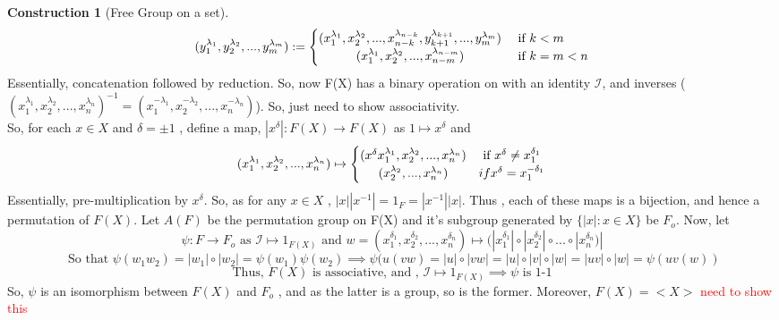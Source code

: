 \documentclass{article}
\theoremstyle{definition}
\theoremstyle{definition}
\newtheorem{construction}{Construction}[theorem]
\begin{document}
\begin{construction}[Free Group on a set]
\[			(y_1^{\lambda_1},y_2^{\lambda_2},...,y_m^{\lambda_m}):=
			\begin{cases}
				(x_1^{\lambda_1},x_2^{\lambda_2},...,x_{n-k}^{\lambda_{n-k}},
				y_{k+1}^{\lambda_{k+1}},...,y_m^{\lambda_m}) &\text{ if } k<m \\
				\hfil	(x_1^{\lambda_1},x_2^{\lambda_2},...,x_{n-m}^{\lambda_{n-m}}) & \text{ if } k=m<n \\
			\end{cases} \]
			Essentially, concatenation followed by reduction. So, now F(X) has a binary operation on with an identity $\mathcal{I}$, and inverses ($(x_1^{\lambda_1},x_2^{\lambda_2},...,x_n^{\lambda_n})^{-1}=
			(x_1^{-\lambda_1},x_2^{-\lambda_2},...,x_n^{-\lambda_n})$). So, just need to show associativity.\\
			So, for each $x\in X$ and $\delta=\pm 1$ , define a map, $|x^{\delta}|:F(X) \rightarrow F(X)$ as $1 \mapsto x^\delta$ and
			\[
				(x_1^{\lambda_1},x_2^{\lambda_2},...,x_n^{\lambda_n}) \mapsto
				\begin{cases}
					(x^\delta x_1^{\lambda_1},x_2^{\lambda_2},...,x_n^{\lambda_n}) & \text{ if } x^\delta \neq x_1^{\delta_1}\\
					\hfil (x_2^{\lambda_2},...,x_n^{\lambda_n}) & if x^\delta = x_1^{-\delta_1}

				\end{cases}
		\]
		Essentially, pre-multiplication by $x^\delta$. So, as for any $x\in X$ , $|x||x^{-1}|=1_F=|x^{-1}||x|$. Thus , each of these maps is a bijection, and hence a permutation of $F(X)$. Let $A(F)$ be the permutation group on F(X) and it's subgroup generated by $\{|x| : x \in X\}$ be $F_o$. Now, let
		\[ \psi : F \rightarrow F_o \text{ as } \mathcal{I} \mapsto 1_{F(X)} \text{ and } w=(x_1^{\delta_1},x_2^{\delta_2},...,x_n^{\delta_n}) \mapsto (|x_1^{\delta_1}| \circ |x_2^{\delta_2}|\circ...\circ|x_n^{\delta_n})| \]
		\[ \text{ So that } \psi(w_1w_2)=|w_1|\circ |w_2|=\psi(w_1)\psi(w_2) \implies  \psi(u(vw)=|u|\circ |vw|= |u|\circ|v|\circ|w|=|uv|\circ|w|=\psi(uv(w))\]
		\[ \text{ Thus, $F(X)$ is associative, and , } \mathcal{I} \mapsto 1_{F(X)} \implies \psi \text{ is 1-1 } \]
		So, $\psi$ is an isomorphism between $F(X)$ and $F_o$ , and as the latter is a group, so is the former.
		Moreover, $F(X)=<X>$ \textcolor{red}{need to show this}

		\end{construction}


		
\end{document}
